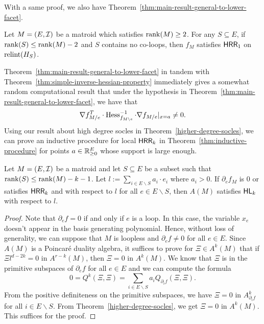 \documentclass{puthesis-UG}
\begin{document}
With a same proof, we also have Theorem~\ref{thm:main-result-general-to-lower-facet}. 

\begin{thm} \label{thm:main-result-general-to-lower-facet}
	Let $M = (E, \mathcal{I})$ be a matroid which satisfies $\operatorname{rank} (M) \geq 2$. For any $S \subseteq E$, if $\operatorname{rank}(S) \leq \operatorname{rank} (M) - 2$ and $S$ contains no co-loops, then $f_M$ satisfies $\mathsf{HRR}_1$ on $\operatorname{relint} (H_S)$. 
\end{thm}

Theorem~\ref{thm:main-result-general-to-lower-facet} in tandem with Theorem~\ref{thm:simple-inverse-hessian-property} immediately gives a somewhat random computational result that under the hypothesis in Theorem~\ref{thm:main-result-general-to-lower-facet}, we have that
\[
	\nabla f_{M / e}^T \cdot \operatorname{Hess}_{f_{M \backslash e}}^{-1} \cdot \nabla f_{M/e} |_{x = a} \neq 0.
\]
Using our result about high degree socles in Theorem~\ref{higher-degree-socles}, we can prove an inductive procedure for local $\mathsf{HRR}_k$ in Theorem~\ref{thm:inductive-procedure} for points $a \in \mathbb{R}_{\geq 0}^E$ whose support is large enough. 
\begin{thm} \label{thm:inductive-procedure}
	Let $M = (E, \mathcal{I})$ be a matroid and let $S \subseteq E$ be a subset such that $\operatorname{rank} (S) \leq \operatorname{rank} (M) - k - 1$. Let $l := \sum_{i \in E \backslash S} a_i \cdot e_i$ where $a_i > 0$. If $\partial_e f_M$ is $0$ or satisfies $\mathsf{HRR}_k$ and with respect to $l$ for all $e \in E \backslash S$, then $A(M)$ satisfies $\mathsf{HL}_k$ with respect to $l$. 
\end{thm}

\begin{proof}
	Note that $\partial_e f = 0$ if and only if $e$ is a loop. In this case, the variable $x_e$ doesn't appear in the basis generating polynomial. Hence, without loss of generality, we can suppose that $M$ is loopless and $\partial_e f \neq 0$ for all $e \in E$. Since $A(M)$ is a Poincar\'e duality algebra, it suffices to prove for $\Xi \in A^k(M)$ that if $\Xi l^{d-2k} = 0$ in $A^{r-k}(M)$, then $\Xi = 0$ in $A^k(M)$. We know that $\Xi$ is in the primitive subspaces of $\partial_e f$ for all $e \in E$ and we can compute the formula
	\[
		0 = Q^k (\Xi, \Xi) = \sum_{i \in E \backslash S} a_i Q_{\partial_i f} (\Xi, \Xi).
	\]
	From the positive definiteness on the primitive subspaces, we have $\Xi = 0$ in $A^k_{\partial_i f}$ for all $i \in E\backslash S$. From Theorem~\ref{higher-degree-socles}, we get $\Xi = 0$ in $A^k(M)$. This suffices for the proof. 
\end{proof}
\end{document}
